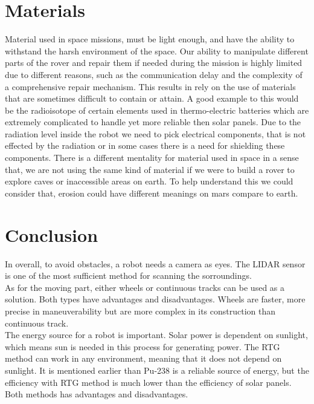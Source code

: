 \section{Materials}
Material used in space missions, must be light enough, and have the ability to withstand the harsh environment of the space.
Our ability to manipulate different parts of the rover and repair them if needed during the mission is highly limited due to different reasons, such as the communication delay and the complexity of a comprehensive repair mechanism. This results in rely on the use of materials that are sometimes difficult to contain or attain. A good example to this would be the radioisotope of certain elements used in thermo-electric batteries which are extremely complicated to handle yet more reliable then solar panels\cite{NuclearPower}. Due to the radiation level inside the robot we need to pick electrical components, that is not effected by the radiation or in some cases there is a need for shielding these components.
There is a different mentality for material used in space in a sense that, we are not using the same kind of material if we were to build a rover to explore caves or inaccessible areas on earth. To help understand this we could consider that, erosion could have different meanings on mars compare to earth.


\section{Conclusion}
In overall, to avoid obstacles, a robot needs a camera as eyes. The LIDAR sensor is one of the most sufficient method for scanning the sorroundings.\\
As for the moving part, either wheels or continuous tracks can be used as a solution. Both types have advantages and disadvantages. Wheels are faster, more precise in maneuverability but are more complex in its construction than continuous track.\\
The energy source for a robot is important. Solar power is dependent on sunlight, which means sun is needed in this process for generating power. The RTG method can work in any environment, meaning that it does not depend on sunlight. It is mentioned earlier than Pu-238 is a reliable source of energy, but the efficiency with RTG method is much lower than the efficiency of solar panels. Both methods has advantages and disadvantages.\\
